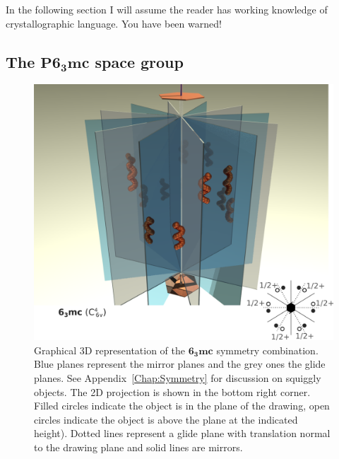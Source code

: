 In the following section I will assume the reader has working knowledge of crystallographic language. You have been warned!


\subsection{The \texorpdfstring{$\mathbf{P6_3mc}$}{P63mc} space group }

\begin{figure}
    \centering
\includegraphics[width=1.\linewidth]{Figures/6_3mc.png}
\caption[Graphical 3D representation of the $\mathbf{6_3mc}$ symmetry.]{Graphical 3D representation of the $\mathbf{6_3mc}$ symmetry combination. Blue planes represent the mirror planes and the grey ones the glide planes. See Appendix~\ref{Chap:Symmetry} for discussion on squiggly objects. The 2D projection is shown in the bottom right corner. Filled circles indicate the object is in the plane of the drawing, open circles indicate the object is above the plane at the indicated height). Dotted lines represent a glide plane with translation normal to the drawing plane and solid lines are mirrors. }
\label{Fig:6_3mc}
\end{figure}


